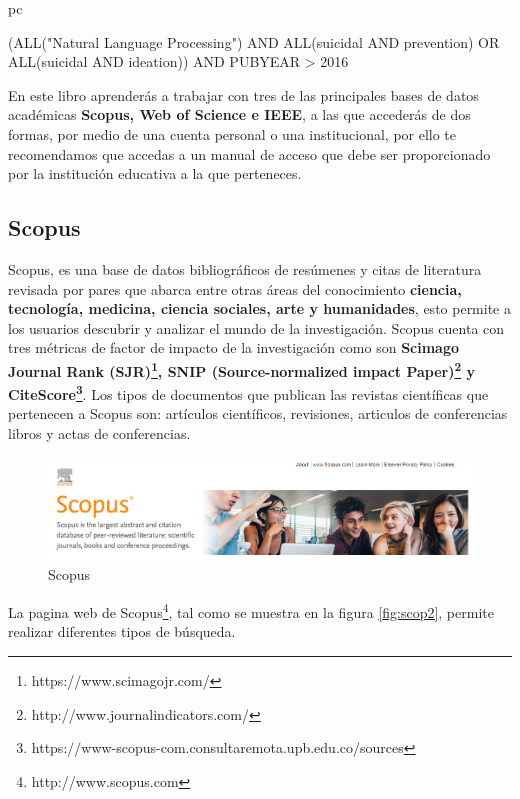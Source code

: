 pc\documentclass[a4paper,12pt,openany]{book}
\begin{document}
\begin{itemize}
(ALL("Natural Language Processing") AND ALL(suicidal AND prevention) OR ALL(suicidal AND ideation)) AND PUBYEAR > 2016 

En este libro aprenderás a trabajar con tres de las principales bases de datos  académicas \textbf{Scopus, Web of Science e IEEE}, a las que accederás de dos formas, por medio de una cuenta personal o una institucional, por ello te recomendamos que accedas a un manual de acceso que debe ser proporcionado por la institución educativa a la que perteneces.

\clearpage
\subsection{Scopus}

Scopus, es una base de datos bibliográficos de resúmenes y citas de literatura revisada por pares que abarca entre otras áreas del conocimiento \textbf{ciencia, tecnología, medicina, ciencia sociales, arte y humanidades}, esto permite a los  usuarios descubrir y analizar el mundo de la investigación. Scopus cuenta con tres métricas de factor de impacto de la investigación como son \textbf{Scimago Journal Rank (SJR)\footnote{https://www.scimagojr.com/}, SNIP (Source-normalized impact Paper)\footnote{http://www.journalindicators.com/} y CiteScore\footnote{https://www-scopus-com.consultaremota.upb.edu.co/sources}}. Los tipos de documentos que publican las revistas científicas que pertenecen a Scopus son: artículos científicos, revisiones, articulos de conferencias libros y actas de conferencias.

       \begin{figure}[H]
        \centering
    	\includegraphics[width=12cm]{Scop1.png}
        \caption{Scopus}
        \label{fig:scop1}
        \end{figure}

La pagina web de Scopus\footnote{http://www.scopus.com}, tal como se muestra en la figura \ref{fig:scop2}, permite realizar diferentes tipos de búsqueda.  
 

\end{itemize}
\end{document}
